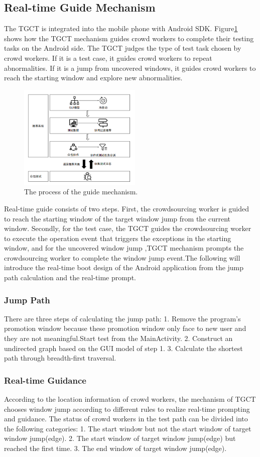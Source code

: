 \subsection{Real-time Guide Mechanism}
The TGCT is integrated into the mobile phone with Android SDK. Figure\ref{fig:guide} shows how the TGCT mechanism guides crowd workers to complete their testing tasks on the Android side. The TGCT judges the type of test task chosen by crowd workers. If it is a test case, it guides crowd workers to repeat abnormalities. If it is a jump from uncovered windows, it guides crowd workers to reach the starting window and explore new abnormalities.
\begin{figure}[htbp]
\centering
\centerline{\includegraphics[width=\columnwidth,height=5cm]{fig/7.png}}
\caption{The process of the guide mechanism.}
\label{fig:guide}
\end{figure}

Real-time guide consists of two steps. First, the crowdsourcing worker is guided to reach the starting window of the target window jump from the current window. Secondly, for the test case, the TGCT guides the crowdsourcing worker to execute the operation event that triggers the exceptions in the starting window, and for the uncovered window jump ,TGCT mechanism prompts the crowdsourcing worker to complete the window jump event.The following will introduce the real-time boot design of the Android application from the jump path calculation and the real-time prompt.

\subsubsection{Jump Path}
There are three steps of calculating the jump path:
1. Remove the program's promotion window because these promotion window only face to new user and they are not meaningful.Start test from the MainActivity.
2. Construct an undirected graph based on the GUI model of step 1.
3. Calculate the shortest path through breadth-first traversal.
\subsubsection{Real-time Guidance}
According to the location information of crowd workers, the mechanism of TGCT chooses window jump according to different rules to realize real-time prompting and guidance. 
The status of crowd workers in the test path can be divided into the following categories:
1. The start window but not the start window of target window jump(edge).
2. The start window of target window jump(edge) but reached the first time.
3. The end window of target window jump(edge).

